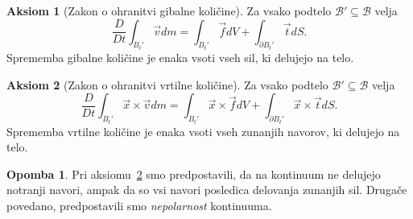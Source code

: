 \documentclass[12pt,a4paper,twoside]{article}
\theoremstyle{definition} %
\newtheorem{opomba}[definicija]{Opomba}
\newtheorem{aksiom}{Aksiom}
\theoremstyle{plain} %
\numberwithin{equation}{section}
\newcommand{\B}{\mathcal{B}}
\newcommand{\DD}[2]{\ensuremath{\frac{D #1}{D #2}}}
\newcommand{\DDt}[1]{\DD{#1}{t}}
\newcommand{\vv}{\vec{v}}
\newcommand{\vt}{\vec{t}}
\newcommand{\vf}{\vec{f}}
\newcommand{\vx}{\vec{x}}
\begin{document}
\begin{aksiom}[Zakon o ohranitvi gibalne količine]
  \label{aks:gib}
  Za vsako podtelo $\B' \subseteq \B$ velja
  \begin{equation}
    \DDt{}\int_{B_t'} \vv dm = \int_{B_t'} \vf dV + \int_{\partial B_t'} \vec t dS.
    \label{eq:gib}
  \end{equation}
  Sprememba gibalne količine je enaka vsoti vseh sil, ki delujejo na telo.
\end{aksiom}

\begin{aksiom}[Zakon o ohranitvi vrtilne količine]
  \label{aks:vrt}
  Za vsako podtelo $\B' \subseteq \B$ velja
  \begin{equation}
    \DDt{}\int_{B_t'}\vx \times \vv dm = \int_{B_t'} \vx \times \vf dV +
    \int_{\partial B_t'} \vx\times\vt dS.
    \label{eq:vrt}
  \end{equation}
  Sprememba vrtilne količine je enaka vsoti vseh zunanjih navorov, ki delujejo
  na telo.
\end{aksiom}
\begin{opomba}
  Pri aksiomu~\ref{aks:vrt} smo predpostavili, da na kontinuum ne delujejo notranji navori, ampak da
  so vsi navori posledica delovanja zunanjih sil. Drugače povedano, predpostavili smo
  \emph{nepolarnost} kontinuuma.
\end{opomba}
\end{document}
